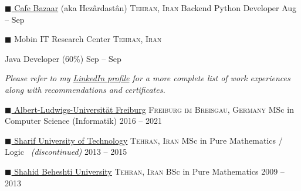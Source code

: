 \documentclass[10pt,a4paper]{article}
\newcommand{\colorsquare}[1]{\textcolor{#1}{$\blacksquare$}}
\begin{document}
\headedsection  %
  {\href{https://en.wikipedia.org/wiki/Cafe_Bazaar}{\colorsquare{bazaar} Cafe Bazaar} (aka Hezârdastân)}
  {\textsc{Tehran, Iran}} {%
  \headedsubsection
    {Backend Python Developer}
    {Aug  -- Sep }
    {}
}

\headedsection
  {\colorsquare{camouflagegreen} Mobin IT Research Center}
  {\textsc{Tehran, Iran}} {%

  \headedsubsection
    {Java Developer (60\%)}
    {Sep  -- Sep }
    {}
}

\vspace{-0.2em}
\begin{center}
  \emph{\small Please refer to my \href{http://www.linkedin.com/in/aerabi}{LinkedIn profile} for a more complete list of work experiences along with recommendations and certificates.}
\end{center}

\spacedhrule{-0.2em}{-0.4em}


\headedsection
  {\href{http://www.uni-freiburg.de/}{\colorsquare{carolinablue} Albert-Ludwigs-Universität Freiburg}}
  {\textsc{Freiburg im Breisgau, Germany}} {%
  \headedsubsection
    {MSc in Computer Science (Informatik)}
    {2016 -- 2021}
    {}
}

\headedsection
  {\href{http://www.en.sharif.edu/}{\colorsquare{amethyst} Sharif University of Technology}}
  {\textsc{Tehran, Iran}} {%
  \headedsubsection
    {MSc in Pure Mathematics / Logic \textnormal{\textit{~(discontinued)}}}
    {2013 -- 2015} 
    {}
}

\headedsection
  {\href{http://en.sbu.ac.ir/}{\colorsquare{brickred} Shahid Beheshti University}}
  {\textsc{Tehran, Iran}} {%
  \headedsubsection
    {BSc in Pure Mathematics}
    {2009 -- 2013} 
    {
    }
}
\end{document}
